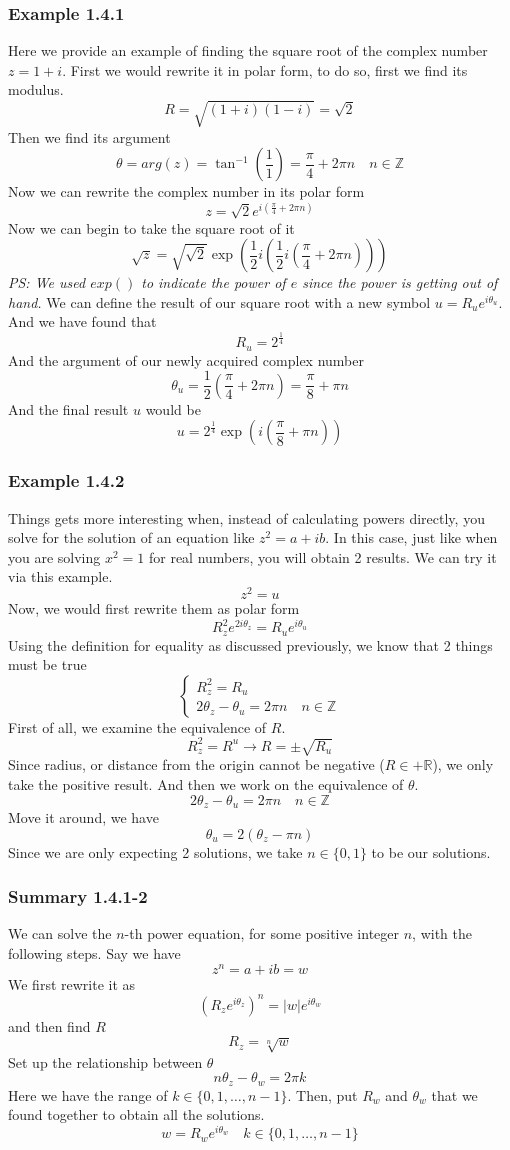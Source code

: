 \documentclass[12pt]{book}
\newcommand{\Z}{\mathbb{Z}}
\newcommand{\R}{\mathbb{R}}
\newcommand{\paren}[1]{\left( #1 \right)}
\newcommand{\abso}[1]{\left|#1 \right|}
\newcommand{\then}{\rightarrow}
\newcommand{\compo}[2]{#1 e^{i #2}}
\begin{document}
\subsubsection{Example 1.4.1}
Here we provide an example of finding the square root of the complex number $z = 1+i$. First we would rewrite it in polar form, to do so, first we find its modulus. 
\[
R = \sqrt{(1+i)(1-i)} = \sqrt{2}
\]
Then we find its argument
\[
\theta = arg(z) = \tan^{-1} \paren{\frac{1}{1}} = \frac{\pi}{4} + 2\pi n \quad n \in \Z
\]
Now we can rewrite the complex number in its polar form
\[
z = \sqrt{2}e^{i\paren{\frac{\pi}{4} + 2\pi n}}
\]
Now we can begin to take the square root of it
\[
\sqrt{z} = \sqrt{\sqrt{2}}\exp\paren{\frac{1}{2}i\paren{{\frac{1}{2}i\paren{\frac{\pi}{4} + 2\pi n}}}}
\]
\textit{PS: We used $exp()$ to indicate the power of $e$ since the power is getting out of hand.}
We can define the result of our square root with a new symbol $u = R_u e^{i\theta_u}$. And we have found that
\[
R_u = 2^\frac{1}{4}
\]
And the argument of our newly acquired complex number
\[
\theta_u = \frac{1}{2}\paren{\frac{\pi}{4} + 2\pi n} = \frac{\pi}{8} + \pi n 
\]
And the final result $u$ would be 
\[
u = 2^\frac{1}{4} \exp \paren{i \paren{\frac{\pi}{8}+\pi n}}
\]
\subsubsection{Example 1.4.2}
Things gets more interesting when, instead of calculating powers directly, you solve for the solution of an equation like $z^2 = a+ib$. In this case, just like when you are solving $x^2 = 1$ for real numbers, you will obtain 2 results. We can try it via this example.
\[
z^2 = u
\]
Now, we would first rewrite them as polar form
\[
R_z^2e^{2i\theta_z} = \compo{R_u}{\theta_u}
\]
Using the definition for equality as discussed previously, we know that 2 things must be true
\[
\begin{cases}
    R_z^2 = R_u\\
    2\theta_z - \theta_u = 2\pi n \quad n \in \Z
\end{cases}
\]
First of all, we examine the equivalence of $R$.
\[
R_z^2 = R^u \then R= \pm \sqrt{R_u}
\]
Since radius, or distance from the origin cannot be negative ($R \in +\R$), we only take the positive result. And then we work on the equivalence of $\theta$.
\[
2\theta_z - \theta_u = 2\pi n \quad n \in \Z
\]
Move it around, we have
\[
\theta_u = 2\paren{\theta_z - \pi n}
\]
Since we are only expecting 2 solutions, we take $n \in \{ 0,1\}$ to be our solutions.
\subsubsection{Summary 1.4.1-2}
We can solve the $n$-th power equation, for some positive integer $n$, with the following steps. Say we have
\[
z^n = a+ib = w
\]
We first rewrite it as
\[
 \paren{\compo{R_z}{\theta_z}}^n = \compo{\abso{w}}{\theta_w}
\]
and then find $R$
\[
R_z = \sqrt[n]{w}
\]
Set up the relationship between $\theta$
\[
n\theta_z - \theta_w = 2\pi k
\]
Here we have the range of $k \in \{0,1,\ldots,n-1\}$. Then, put $R_w$ and $\theta_w$ that we found together to obtain all the solutions.
\[
w = \compo{R_w}{\theta_w} \quad k \in \{0,1,\ldots,n-1\}
\]
\end{document}
